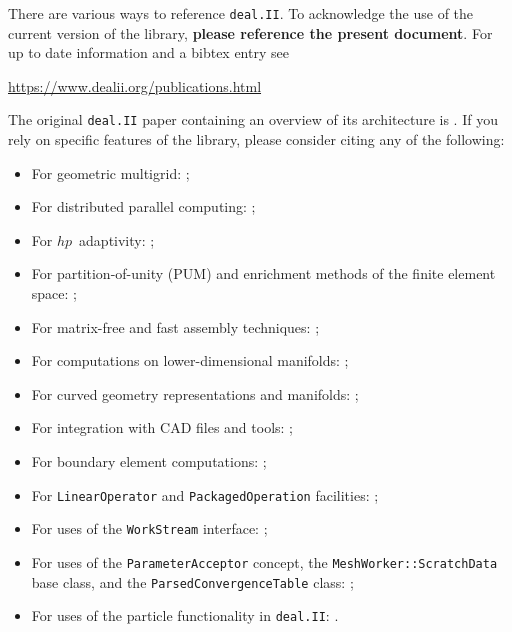 \documentclass{ansarticle-preprint}
\newcommand{\specialword}[1]{\texttt{#1}}
\newcommand{\dealii}{{\specialword{deal.II}}\xspace}
\begin{document}
There are various ways to reference \dealii{}. To acknowledge the use of
the current version of the library, \textbf{please reference the present
  document}. For up to date information and a bibtex entry
see
\begin{center}
  \url{https://www.dealii.org/publications.html}
\end{center}

The original \dealii{} paper containing an overview of its
architecture is \cite{BangerthHartmannKanschat2007}. If you rely on
specific features of the library, please consider citing any of the
following:
\begin{multicols}{2}
  \vspace*{-36pt}
  \begin{itemize}
    \item For geometric multigrid: \cite{Kanschat2004,JanssenKanschat2011,ClevengerHeisterKanschatKronbichler2019};
    \item For distributed parallel computing: \cite{BangerthBursteddeHeisterKronbichler11};
    \item For $hp$~adaptivity: \cite{BangerthKayserHerold2007};
    \item For partition-of-unity (PUM) and enrichment methods of the
          finite element space: \cite{Davydov2016};
    \item For matrix-free and fast assembly techniques:
          \cite{KronbichlerKormann2012,KronbichlerKormann2019};
    \item For computations on lower-dimensional manifolds:
          \cite{DeSimoneHeltaiManigrasso2009};
    \item For curved geometry representations and manifolds:
          \cite{HeltaiBangerthKronbichlerMola2019};
          \vfill\null  \columnbreak
    \item For integration with CAD files and tools:
          \cite{HeltaiMola2015};
    \item For boundary element computations:
          \cite{GiulianiMolaHeltai-2018-a};
    \item For \texttt{LinearOperator} and \texttt{PackagedOperation} facilities:
          \cite{MaierBardelloniHeltai-2016-a,MaierBardelloniHeltai-2016-b};
    \item For uses of the \texttt{WorkStream} interface:
          \cite{TKB16};
    \item For uses of the \texttt{ParameterAcceptor} concept, the
          \texttt{MeshWorker::ScratchData} base class, and the
          \texttt{ParsedConvergenceTable} class:
          \cite{SartoriGiulianiBardelloni-2018-a};
    \item For uses of the particle functionality in \dealii{}:
          \cite{GLHPB18}.
          \vfill\null
  \end{itemize}
\end{multicols}
\end{document}
